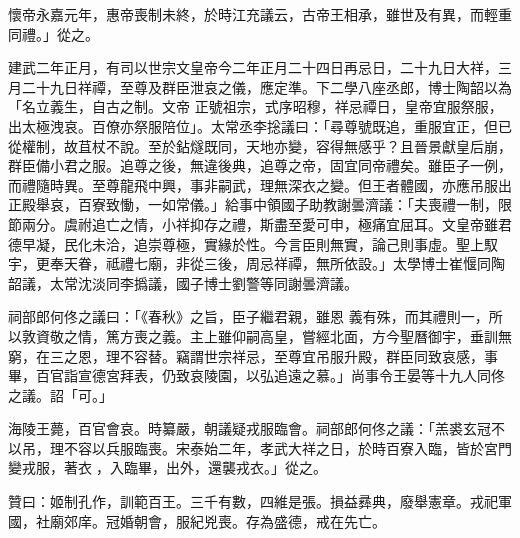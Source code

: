 \begin{pinyinscope}
 懷帝永嘉元年，惠帝喪制未終，於時江充議云，古帝王相承，雖世及有異，而輕重同禮。」從之。



 建武二年正月，有司以世宗文皇帝今二年正月二十四日再忌日，二十九日大祥，三月二十九日祥禫，至尊及群臣泄哀之儀，應定準。下二學八座丞郎，博士陶韶以為「名立義生，自古之制。文帝
 正號祖宗，式序昭穆，祥忌禫日，皇帝宜服祭服，出太極洩哀。百僚亦祭服陪位」。太常丞李捴議曰：「尋尊號既追，重服宜正，但已從權制，故苴杖不說。至於鉆燧既同，天地亦變，容得無感乎？且晉景獻皇后崩，群臣備小君之服。追尊之後，無違後典，追尊之帝，固宜同帝禮矣。雖臣子一例，而禮隨時異。至尊龍飛中興，事非嗣武，理無深衣之變。但王者體國，亦應吊服出正殿舉哀，百寮致慟，一如常儀。」給事中領國子助教謝曇濟議：「夫喪禮一制，限節兩分。虞祔追亡之情，小祥抑存之禮，斯盡至愛可申，極痛宜屈耳。文皇帝雖君德早凝，民化未洽，追崇尊極，實緣於性。今言臣則無實，論己則事虛。聖上馭宇，更奉天眷，祗禮七廟，非從三後，周忌祥禫，無所依設。」太學博士崔愝同陶韶議，太常沈淡同李撝議，國子博士劉警等同謝曇濟議。



 祠部郎何佟之議曰：「《春秋》之旨，臣子繼君親，雖恩
 義有殊，而其禮則一，所以敦資敬之情，篤方喪之義。主上雖仰嗣高皇，嘗經北面，方今聖曆御宇，垂訓無窮，在三之恩，理不容替。竊謂世宗祥忌，至尊宜吊服升殿，群臣同致哀感，事畢，百官詣宣德宮拜表，仍致哀陵園，以弘追遠之慕。」尚事令王晏等十九人同佟之議。詔「可。」



 海陵王薨，百官會哀。時纂嚴，朝議疑戎服臨會。祠部郎何佟之議：「羔裘玄冠不以吊，理不容以兵服臨喪。宋泰始二年，孝武大祥之日，於時百寮入臨，皆於宮門變戎服，著衣𢂿，入臨畢，出外，還襲戎衣。」從之。



 贊曰：姬制孔作，訓範百王。三千有數，四維是張。損益彞典，廢舉憲章。戎祀軍國，社廟郊庠。冠婚朝會，服紀兇喪。存為盛德，戒在先亡。



\end{pinyinscope}